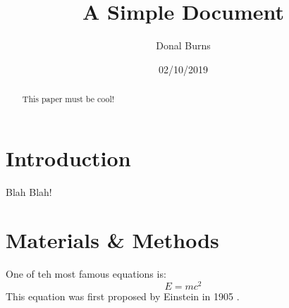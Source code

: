 \documentclass[12pt]{article}
\title{A Simple Document}
\author{Donal Burns}
\date{02/10/2019}
\begin{document}
  \maketitle

  \begin{abstract}
    This paper must be cool!
  \end{abstract}

  \section{Introduction}
    Blah Blah!

  \section{Materials \& Methods}
  One of teh most famous equations is:
  \begin{equation}
    E = mc^2
  \end{equation}
  This equation was first proposed by Einstein in 1905
  \cite{einstein1905does}.

  
  
\end{document}
